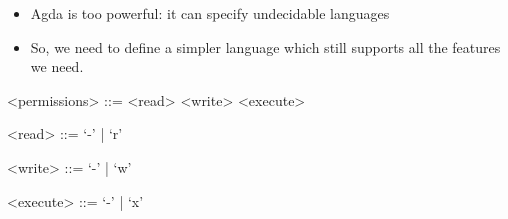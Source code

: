 \begin{itemize}
\item Agda is too powerful: it can specify undecidable languages 
\item So, we need to define a simpler language which still supports all the features we need.
\end{itemize}


\begin{grammar}
<permissions>  ::= <read> <write> <execute>

<read>         ::= `-' | `r'

<write>        ::= `-' | `w'

<execute>      ::= `-' | `x'
\end{grammar}

\begin{code}[hide]%
\>[0]\AgdaSpace{}%
\AgdaSpace{}%
\AgdaSpace{}%
\AgdaSpace{}%
\AgdaSymbol{:}\AgdaSpace{}%
\<%
\\
%
\\[\AgdaEmptyExtraSkip]%
\>[0]\AgdaSpace{}%
\AgdaSpace{}%
\<%
\end{code}

